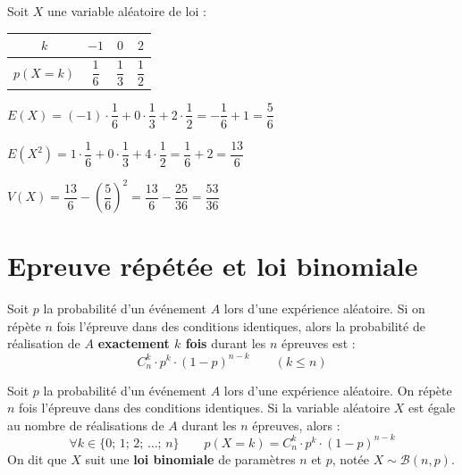 \begin{exemple}
Soit $X$ une variable al\'{e}atoire de loi :

\begin{center}
\renewcommand{\arraystretch}{1.4}
\begin{tabular}{|c|c|c|c|}
  \hline
  \rowcolor{navylight}
  $k$ & $-1$ & $0$ & $2$ \\
  \hline
  $p(X=k)$ & $\dfrac{1}{6}$ & $\dfrac{1}{3}$ & $\dfrac{1}{2}$ \\
  \hline
\end{tabular}
\end{center}

\medskip
$E(X) = (-1)\cdot\dfrac{1}{6} + 0\cdot\dfrac{1}{3} + 2\cdot\dfrac{1}{2}
       = -\dfrac{1}{6} + 1 = \dfrac{5}{6}$

$E(X^2) = 1\cdot\dfrac{1}{6} + 0\cdot\dfrac{1}{3} + 4\cdot\dfrac{1}{2}
         = \dfrac{1}{6} + 2 = \dfrac{13}{6}$

$V(X) = \dfrac{13}{6} - \left(\dfrac{5}{6}\right)^2
       = \dfrac{13}{6} - \dfrac{25}{36} = \dfrac{53}{36}$
\end{exemple}

\section{Epreuve r\'{e}p\'{e}t\'{e}e et loi binomiale}

\begin{theoreme}[Epreuve r\'{e}p\'{e}t\'{e}e]
Soit $p$ la probabilit\'{e} d'un \'{e}v\'{e}nement $A$ lors d'une exp\'{e}rience al\'{e}atoire.
Si on r\'{e}p\`{e}te $n$ fois l'\'{e}preuve dans des conditions identiques,
alors la probabilit\'{e} de r\'{e}alisation de $A$ \textbf{exactement $k$ fois}
durant les $n$ \'{e}preuves est :
\[
  C_n^k \cdot p^k \cdot (1-p)^{n-k} \qquad (k \leq n)
\]
\end{theoreme}

\begin{definition}
Soit $p$ la probabilit\'{e} d'un \'{e}v\'{e}nement $A$ lors d'une exp\'{e}rience al\'{e}atoire.
On r\'{e}p\`{e}te $n$ fois l'\'{e}preuve dans des conditions identiques.
Si la variable al\'{e}atoire $X$ est \'{e}gale au nombre de r\'{e}alisations de $A$
durant les $n$ \'{e}preuves, alors :
\[
  \forall k \in \{0;\,1;\,2;\,\ldots;\,n\} \qquad
  p(X = k) = C_n^k \cdot p^k \cdot (1-p)^{n-k}
\]
On dit que $X$ suit une \textbf{loi binomiale} de param\`{e}tres $n$ et $p$,
not\'{e}e $X \sim \mathcal{B}(n,p)$.
\end{definition}


